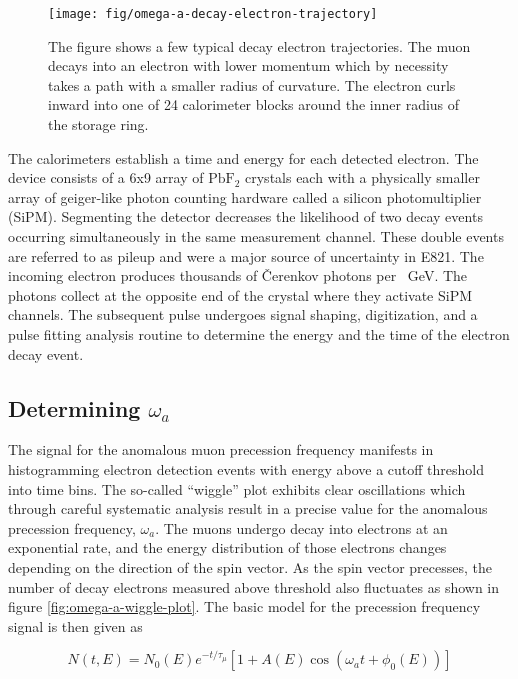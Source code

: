 \begin{figure}
\centering
\texttt{[image: fig/omega-a-decay-electron-trajectory]}
\caption{
    The figure shows a few typical decay electron trajectories.  The muon decays into an electron with lower momentum which by necessity takes a path with a smaller radius of curvature.  The electron curls inward into one of 24 calorimeter blocks around the inner radius of the storage ring. 
    \label{fig:omega-a-decay-electron-trajectory}
}
\end{figure}

The calorimeters establish a time and energy for each detected electron.  The device consists of a 6x9 array of $\mathrm{PbF_2}$ crystals each with a physically smaller array of geiger-like photon counting hardware called a silicon photomultiplier (SiPM).  Segmenting the detector decreases the likelihood of two decay events occurring simultaneously in the same measurement channel.  These double events are referred to as pileup and were a major source of uncertainty in E821.  The incoming electron produces thousands of \v{C}erenkov photons per \SI{}{\GeV}.  The photons collect at the opposite end of the crystal where they activate SiPM channels.  The subsequent pulse undergoes signal shaping, digitization, and a pulse fitting analysis routine to determine the energy and the time of the electron decay event.  

\subsection{Determining $\omega_a$}

The signal for the anomalous muon precession frequency manifests in histogramming electron detection events with energy above a cutoff threshold into time bins. The so-called ``wiggle'' plot exhibits clear oscillations which through careful systematic analysis result in a precise value for the anomalous precession frequency, $\omega_a$.  The muons undergo decay into electrons at an exponential rate, and the energy distribution of those electrons changes depending on the direction of the spin vector.  As the spin vector precesses, the number of decay electrons measured above threshold also fluctuates as shown in figure \ref{fig:omega-a-wiggle-plot}.  The basic model for the precession frequency signal is then given as 

\begin{equation}
\label{eqn:omega-a-signal}
N(t, E) = N_0(E) e^{-t/\tau_\mu} \left[ 1 + A(E) \cos(\omega_a t + \phi_0(E))\right]
\end{equation}

